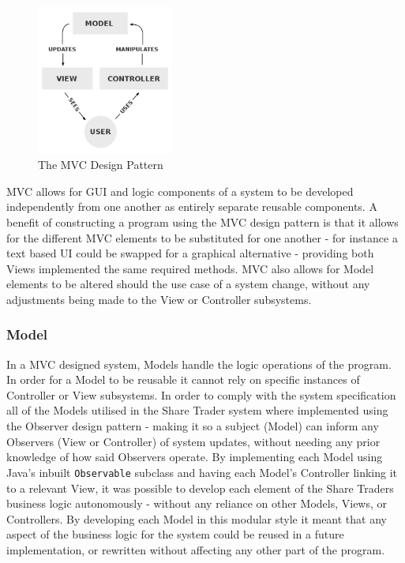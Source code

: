 \documentclass[12pt, a4paper,titlepage]{article}
\begin{document}
\begin{figure}[h]
    \begin{center}
        \includegraphics[width = 0.40\textwidth]{./res/mvc.png}
        \caption[The MVC Design Pattern]{The MVC Design Pattern 
        \footnotemark} 
        \label{fig_mvc}
    \end{center}
\end{figure}
MVC allows for GUI and logic components of a system to be developed
independently from one another as entirely separate reusable components.  
A benefit of constructing a program using the MVC design pattern is that it
allows for the different MVC elements to be substituted for one another - for
instance a text based UI could be swapped for a graphical alternative -
providing both Views implemented the same required methods.
MVC also allows for Model elements to be altered should the use case of a
system change, without any adjustments being made to the View or Controller
subsystems.

\subsubsection{Model}
In a MVC designed system, Models handle the logic operations of the program.
In order for a Model to be reusable it cannot rely on specific instances of
Controller or View subsystems. 
In order to comply with the system specification all of the Models utilised in
the Share Trader system where implemented using the Observer design pattern -
making it so a subject (Model) can inform any Observers (View or Controller)
of system updates, without needing any prior knowledge of how said Observers
operate.  
By implementing each Model using Java’s inbuilt {\tt Observable} subclass and
having each Model’s Controller linking it to a relevant View, it was possible
to develop each element of the Share Traders business logic autonomously -
without any reliance on other Models, Views, or Controllers.
By developing each Model in this modular style it meant that any aspect of the
business logic for the system could be reused in a future implementation, or
rewritten without affecting any other part of the program.
\end{document}
